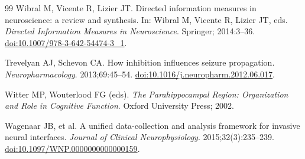 \documentclass[a4paper,fleqn]{cas-dc}
\begin{document}
\begin{thebibliography}{99}
  Wibral M, Vicente R, Lizier JT.
  Directed information measures in neuroscience: a review and synthesis.
  In: Wibral M, Vicente R, Lizier JT, eds.
  \textit{Directed Information Measures in Neuroscience}.
  Springer; 2014:3--36.
  \href{https://doi.org/10.1007/978-3-642-54474-3_1}{doi:10.1007/978-3-642-54474-3\_1}.

  Trevelyan AJ, Schevon CA.
  How inhibition influences seizure propagation.
  \textit{Neuropharmacology}. 2013;69:45--54.
  \href{https://doi.org/10.1016/j.neuropharm.2012.06.017}{doi:10.1016/j.neuropharm.2012.06.017}.

  Witter MP, Wouterlood FG (eds).
  \textit{The Parahippocampal Region: Organization and Role in Cognitive
  Function}. Oxford University Press; 2002.

  Wagenaar JB, et al.
  A unified data-collection and analysis framework for invasive neural
  interfaces.
  \textit{Journal of Clinical Neurophysiology}. 2015;32(3):235--239.
  \href{https://doi.org/10.1097/WNP.0000000000000159}{doi:10.1097/WNP.0000000000000159}.

\end{thebibliography}
\end{document}
